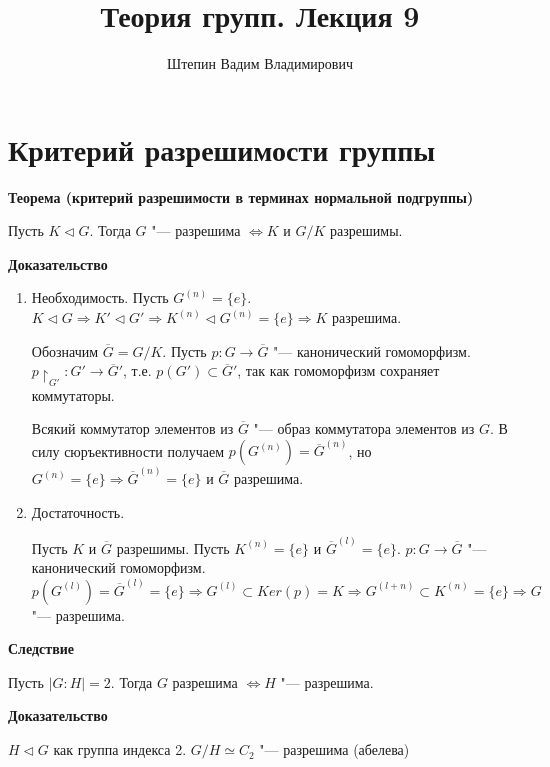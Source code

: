 \documentclass{article}
\title{Теория групп. Лекция 9}
\author{Штепин Вадим Владимирович}
\date{\DTMdate{2019-10-31}}
\begin{document}
\maketitle

\section{Критерий разрешимости группы}

\textbf{Теорема (критерий разрешимости в терминах нормальной подгруппы)}

Пусть $K \triangleleft G$. Тогда $G$ "--- разрешима $\Leftrightarrow K$ и $G/K$ разрешимы.

\vspace{5pt}

\textbf{Доказательство}
\begin{enumerate}
	\item Необходимость. Пусть $G^{(n)} = \{e\}$. $K \triangleleft G \Rightarrow K' \triangleleft G' \Rightarrow K^{(n)} \triangleleft G^{(n)} = \{e\} \Rightarrow K$ разрешима.
	
	Обозначим $\overline{G} = G/K$. Пусть $p: G \rightarrow \overline{G}$ "--- канонический гомоморфизм. $p\!\restriction_{G'}: G' \rightarrow \overline{G}'$, т.е. $p(G') \subset \overline{G}'$, так как гомоморфизм сохраняет коммутаторы.
	
	Всякий коммутатор элементов из $\overline{G}$ "--- образ коммутатора элементов из $G$. В силу сюръективности получаем $p(G^{(n)}) = \overline{G}^{(n)}$, но $G^{(n)} = \{e\} \Rightarrow \overline{G}^{(n)} = \{e\}$ и $\overline{G}$ разрешима.
	
	\item Достаточность. 
	
	Пусть $K$ и $\overline{G}$ разрешимы. Пусть $K^{(n)} = \{e\}$ и $\overline{G}^{(l)} = \{e\}$. $p: G \rightarrow \overline{G}$ "--- канонический гомоморфизм. $p(G^{(l)}) = \overline{G}^{(l)} = \{e\} \Rightarrow G^{(l)} \subset Ker(p) = K \Rightarrow G^{(l + n)} \subset K^{(n)} = \{e\} \Rightarrow G$ "--- разрешима.	 
\end{enumerate}

\vspace{10pt}
	
\textbf{Следствие}
	
Пусть $|G:H| = 2$. Тогда $G$ разрешима $\Leftrightarrow H$ "--- разрешима.
	
\textbf{Доказательство}
	
$H \triangleleft G$ как группа индекса 2. $G/H \simeq C_2$ "--- разрешима (абелева)
	
\end{document}
